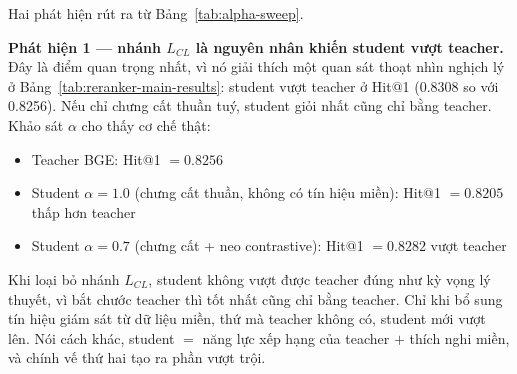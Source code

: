 \documentclass[../DoAn.tex]{subfiles}
\begin{document}
\begin{table}[H]
    \centering
    \caption{Khảo sát $\alpha$ trên pruned H384 (ADR-MSE, không giai đoạn A)}
    \label{tab:alpha-sweep}
    {\small
    \setlength{\tabcolsep}{4pt}
    }
\end{table}

Hai phát hiện rút ra từ Bảng~\ref{tab:alpha-sweep}.

\noindent\textbf{Phát hiện 1 --- nhánh $L_{CL}$ là nguyên nhân khiến student vượt teacher.} Đây là điểm quan trọng nhất, vì nó giải thích một quan sát thoạt nhìn nghịch lý ở Bảng~\ref{tab:reranker-main-results}: student vượt teacher ở Hit@1 (0.8308 so với 0.8256). Nếu chỉ chưng cất thuần tuý, student giỏi nhất cũng chỉ bằng teacher. Khảo sát $\alpha$ cho thấy cơ chế thật:

\begin{itemize}
    \item Teacher BGE: Hit@1 $=0.8256$
    \item Student $\alpha=1.0$ (chưng cất thuần, không có tín hiệu miền): Hit@1 $=0.8205$ thấp hơn teacher
    \item Student $\alpha=0.7$ (chưng cất + neo contrastive): Hit@1 $=0.8282$ vượt teacher
\end{itemize}

Khi loại bỏ nhánh $L_{CL}$, student không vượt được teacher đúng như kỳ vọng lý thuyết, vì bắt chước teacher thì tốt nhất cũng chỉ bằng teacher. Chỉ khi bổ sung tín hiệu giám sát từ dữ liệu miền, thứ mà teacher không có, student mới vượt lên. Nói cách khác, student $=$ năng lực xếp hạng của teacher $+$ thích nghi miền, và chính vế thứ hai tạo ra phần vượt trội.
\end{document}
